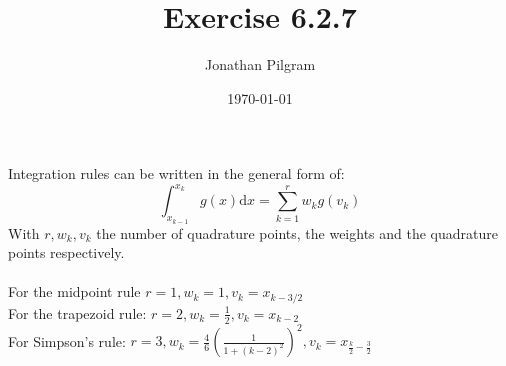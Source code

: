 \documentclass{article}
\title{Exercise 6.2.7}
\author{Jonathan Pilgram}
\date{\today}
\begin{document}
\maketitle

Integration rules can be written in the general form of: 
\[
	\int_{x_{k-1}}^{x_k} g(x) \mathrm{d}x = \sum_{k=1}^{r} w_k g(v_k)
\] 
With $r, w_k, v_k$ the number of quadrature points, the weights and the quadrature points respectively. 
\\\\
For the midpoint rule $r=1, w_k = 1, v_k = x_{k-3/2}  $\\
For the trapezoid rule: $r=2, w_k = \frac{1}{2}, v_k = x_{ k-2 } $ \\
For Simpson's rule: $r=3, w_k = \frac{4}{6} (\frac{1}{1+(k-2)^2} ) ^2, v_k=x_{ \frac{k}{2} - \frac{3}{2}  } $
\end{document}
